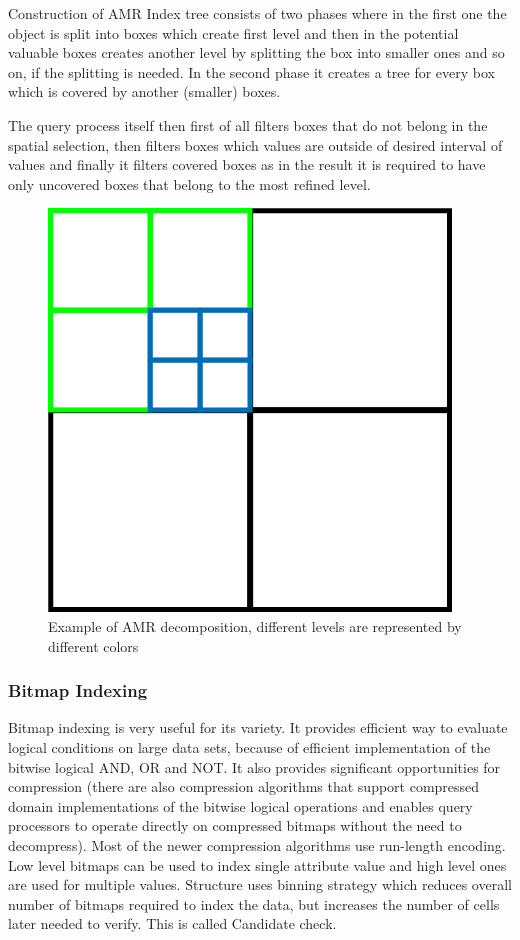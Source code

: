 Construction of AMR Index tree consists of two phases where in the first one the object is split into boxes which create first level and then in the potential valuable boxes creates another level by splitting the box into smaller ones and so on, if the splitting is needed. In the second phase it creates a tree for every box which is covered by another (smaller) boxes.

The query process itself then first of all filters boxes that do not belong in the spatial selection, then filters boxes which values are outside of desired interval of values and finally it filters covered boxes as in the result it is required to have only uncovered boxes that belong to the most refined level.

\begin{figure}
\centering
\includegraphics[scale=0.5]{amr_obr.png}
\caption{Example of AMR decomposition, different levels are represented by different colors}
\end{figure}


\subsubsection{Bitmap Indexing}
Bitmap indexing is very useful for its variety. It provides efficient way to evaluate logical conditions on large data sets, because of efficient implementation of the bitwise logical AND, OR and NOT. It also provides significant opportunities for compression (there are also compression algorithms that support compressed domain implementations of the bitwise logical operations and enables query processors to operate directly on compressed bitmaps without the need to decompress). Most of the newer compression algorithms use run-length encoding. Low level bitmaps can be used to index single attribute value and high level ones are used for multiple values. Structure uses binning strategy which reduces overall number of bitmaps required to index the data, but increases the number of cells later needed to verify. This is called Candidate check. 

